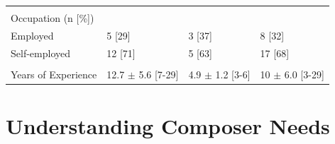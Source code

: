 \begin{landscape}
\begin{table} [!htbp]
\begin{tabular}{|p{6cm}R{4cm}R{4cm}R{4cm}|}
		       															& 											& 											& 											\\
		       		Occupation (n [\%]) 						& 											&											&											\\
		       			\hspace{6mm}Employed 		& 5 [29] 								& 3 [37] 								& 8 [32]								\\
		       			\hspace{6mm}Self-employed 	& 12 [71] 								& 5 [63] 								& 17 [68] 								\\
		       															& 											& 											& 											\\
		       		Years of Experience 					& 12.7 $\pm$ 5.6 [7-29] 		& 4.9 $\pm$ 1.2 [3-6] 			& 10 $\pm$ 6.0 [3-29] 			\\
		       	
		       		\hline
		        \end{tabular}
			\end{table}
		\end{landscape}

	\section{Understanding Composer Needs}

